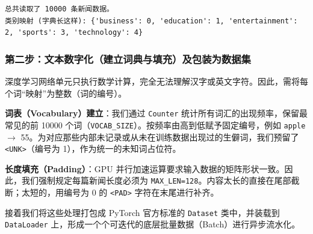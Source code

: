 \documentclass[10pt]{article}
\numberwithin{equation}{section}
\theoremstyle{plain}
\theoremstyle{definition}
\theoremstyle{remark}
\begin{document}
\begin{OutputBox}
	\begin{lstlisting}[style=PythonStyle, backgroundcolor=\color{black!5}]
总共读取了 10000 条新闻数据。
类别映射 (字典长这样): {'business': 0, 'education': 1, 'entertainment': 2, 'sports': 3, 'technology': 4}
\end{lstlisting}
\end{OutputBox}

\subsubsection{第二步：文本数字化（建立词典与填充）及包装为数据集}

深度学习网络单元只执行数学计算，完全无法理解汉字或英文字符。因此，需将每个词“映射”为整数（词的编号）。

\textbf{词表（Vocabulary）建立}：我们通过 \texttt{Counter} 统计所有词汇的出现频率，保留最常见的前 10000 个词（\texttt{VOCAB\_SIZE}）。按频率由高到低赋予固定编号，例如 \texttt{apple} $\rightarrow$ 55。为对应那些内部未记录或从未在训练数据出现过的生僻词，我们预留了 \texttt{<UNK>}（编号为 1），作为统一的未知词占位符。

\textbf{长度填充（Padding）}：GPU 并行加速运算要求输入数据的矩阵形状一致。因此，我们强制规定每篇新闻长度必须为 \texttt{MAX\_LEN=128}。内容太长的直接在尾部截断；太短的，用编号为 0 的 \texttt{<PAD>} 字符在末尾进行补齐。

接着我们将这些处理打包成 PyTorch 官方标准的 \texttt{Dataset} 类中，并装载到 \texttt{DataLoader} 上，形成一个个可迭代的底层批量数据（Batch）进行异步流水化。
\end{document}
